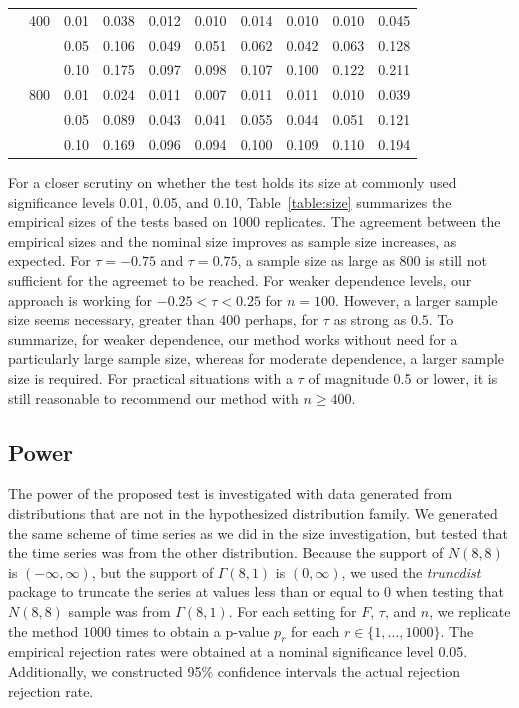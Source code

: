 \documentclass[APA,Times1COL]{WileyNJDv5} %
\begin{document}
\begin{table}[tbp]
\begin{tabular}{lllrrrrrrr}
  & {400} & 0.01 & 0.038 & 0.012 & 0.010 & 0.014 & 0.010 & 0.010 & 0.045 \\ 
  & & 0.05 & 0.106 & 0.049 & 0.051 & 0.062 & 0.042 & 0.063 & 0.128 \\ 
  & & 0.10 & 0.175 & 0.097 & 0.098 & 0.107 & 0.100 & 0.122 & 0.211 \\ 
  & {800} & 0.01 & 0.024 & 0.011 & 0.007 & 0.011 & 0.011 & 0.010 & 0.039 \\ 
  & & 0.05 & 0.089 & 0.043 & 0.041 & 0.055 & 0.044 & 0.051 & 0.121 \\ 
  & & 0.10 & 0.169 & 0.096 & 0.094 & 0.100 & 0.109 & 0.110 & 0.194 \\ 
   \bottomrule
\end{tabular}
\end{table}


For a closer scrutiny on whether the test holds its size at commonly used
significance levels 0.01, 0.05, and 0.10, Table~\ref{table:size}
summarizes the empirical sizes of the tests based on 1000 replicates.
The agreement between the empirical sizes and the nominal size
improves as sample size increases, as expected. For $\tau = -0.75$
and $\tau = 0.75$, a sample size as large as 800 is still not sufficient for the
agreemet to be reached. For weaker dependence levels, our approach is working
for $-0.25 < \tau < 0.25$ for $n = 100$. However, a larger sample size seems 
necessary, greater than 400 perhaps, for $\tau$ as strong as $0.5$. To 
summarize, for weaker dependence, our method works without need for a 
particularly large sample size, whereas for moderate dependence, a larger sample
size is required. For practical situations with a $\tau$ of magnitude 0.5 or
lower, it is still reasonable to recommend our method with $n \ge 400$.



\subsection{Power}
The power of the proposed test is investigated with data generated from
distributions that are not in the hypothesized distribution family. 
We generated the same scheme of time series as we did in the size investigation,
but tested that the time series was from the other distribution.
Because the support of $N(8, 8)$ is
$(-\infty, \infty)$, but the support of $\Gamma(8, 1)$ is $(0, \infty)$, we used
the \textsl{truncdist} package \citep{truncdist} to truncate the series at 
values less than or equal to 0 when testing that $N(8, 8)$ sample was
from $\Gamma(8, 1)$. For each setting for $F$, $\tau$, and $n$, we replicate the 
method $1000$ times 
to obtain a p-value $p_r$ for each $r \in \{1, \ldots, 1000\}$.
The empirical rejection rates were obtained at a nominal significance level 0.05.
Additionally, we constructed 95\% confidence intervals the actual rejection
rejection rate.
\end{document}
